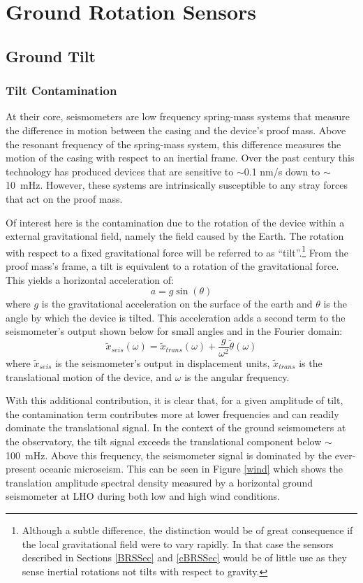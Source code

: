 \documentclass [12pt, proquest]{uwthesis}[2019]
\begin{document}
\chapter{Ground Rotation Sensors} \label{BRS_chap}
\section{Ground Tilt}\label{tilt}
\subsection{Tilt Contamination}\label{tiltCon}
\quad At their core, seismometers are low frequency spring-mass systems that measure the difference in motion between the casing and the device's proof mass. Above the resonant frequency of the spring-mass system, this difference measures the motion of the casing with respect to an inertial frame. Over the past century this technology has produced devices that are sensitive to $\sim$0.1 nm/s down to $\sim$10~mHz. However, these systems are intrinsically susceptible to any stray forces that act on the proof mass.

Of interest here is the contamination due to the rotation of the device within a external gravitational field, namely the field caused by the Earth. The rotation with respect to a fixed gravitational force will be referred to as ``tilt''.\footnote{Although a subtle difference, the distinction would be of great consequence if the local gravitational field were to vary rapidly. In that case the sensors described in Sections \ref{BRSSec} and \ref{cBRSSec} would be of little use as they sense inertial rotations not tilts with respect to gravity.} From the proof mass's frame, a tilt is equivalent to a rotation of the gravitational force. This yields a horizontal acceleration of:
\[ a=g \sin(\theta)\]
where $g$ is the gravitational acceleration on the surface of the earth and $\theta$ is the angle by which the device is tilted. This acceleration adds a second term to the seismometer's output shown below for small angles and in the Fourier domain:
\[\tilde{x}_{seis}(\omega)=\tilde{x}_{trans}(\omega)+\frac{g}{\omega^2}\tilde{\theta}(\omega)\]
where $\tilde{x}_{seis}$ is the seismometer's output in displacement units, $\tilde{x}_{trans}$ is the translational motion of the device, and $\omega$ is the angular frequency. 

With this additional contribution, it is clear that, for a given amplitude of tilt, the contamination term contributes more at lower frequencies and can readily dominate the translational signal. In the context of the ground seismometers at the observatory, the tilt signal exceeds the translational component below $\sim$100~mHz. Above this frequency, the seismometer signal is dominated by the ever-present oceanic microseism. This can be seen in Figure \ref{wind} which shows the translation amplitude spectral density measured by a horizontal ground seismometer at LHO during both low and high wind conditions.
\end{document}
